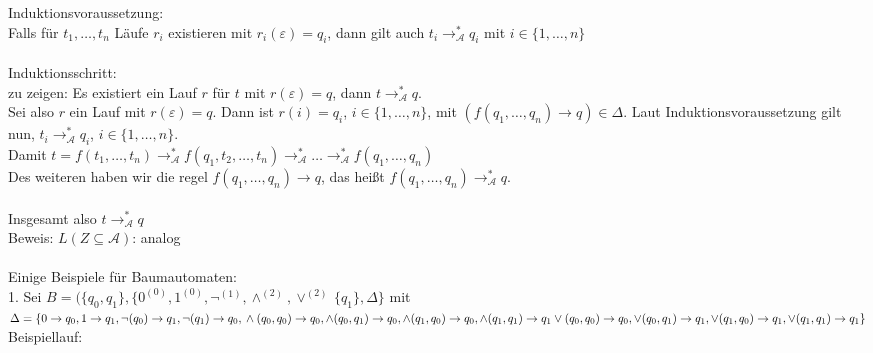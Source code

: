 \documentclass[titlepage]{article}
\begin{document}
Induktionsvoraussetzung:\\
Falls f\"ur $t_1, \dots , t_n$ L\"aufe $r_i$ existieren mit $r_i(\varepsilon) = q_i$, 
dann gilt auch $t_i \rightarrow ^\ast_{\mathcal{A}} q_i$ mit $i\in \{1, \dots , n\}$\\ \\

Induktionsschritt:\\
zu zeigen: Es existiert ein Lauf $r$ f\"ur $t$ mit $r(\varepsilon) = q$, dann 
$t \rightarrow ^\ast_\mathcal{A} q$.\\
Sei also $r$ ein Lauf mit $r(\varepsilon) = q$. Dann ist $r(i) = q_i$, 
$i \in \{1, \dots, n\}$, mit
$(f(q_1, \dots, q_n) \rightarrow q) \in \Delta$. Laut Induktionsvoraussetzung gilt nun,
$t_i \rightarrow ^\ast_\mathcal{A} q_i$, $i \in \{1, \dots, n\}$.\\
Damit $t = f(t_1, \dots, t_n) 
\rightarrow ^\ast_\mathcal{A} f(q_1, t_2, \dots, t_n)
\rightarrow ^\ast_\mathcal{A} \dots
\rightarrow ^\ast_\mathcal{A} f(q_1, \dots, q_n)$\\
Des weiteren haben wir die regel $f(q_1, \dots, q_n) \rightarrow q$, das hei\ss t 
$f(q_1, \dots, q_n) \rightarrow ^\ast_\mathcal{A} q$.\\ \\

Insgesamt also $t \rightarrow ^\ast_\mathcal{A} q$ \\

Beweis: \glqq$L(Z \subseteq \mathcal{A})$\grqq: analog\\ \\

Einige Beispiele f\"ur Baumautomaten:\\

1. Sei $B = (\{q_0, q_1\}, \{0^{(0)},1^{(0)},\lnot^{(1)},\land^{(2)},\lor^{(2)}\,
\{q_1\},\Delta\}$ mit\\
$\Delta = \{ 0 \rightarrow q_0, 1 \rightarrow q_1,\\
\lnot (q_0) \rightarrow q_1, \lnot (q_1) \rightarrow q_0,\\
\land (q_0, q_0) \rightarrow q_0, \land (q_0, q_1) \rightarrow q_0, 
\land (q_1, q_0) \rightarrow q_0, \land (q_1, q_1) \rightarrow q_1\\
\lor (q_0, q_0) \rightarrow q_0, \lor (q_0, q_1) \rightarrow q_1, 
\lor (q_1, q_0) \rightarrow q_1, \lor (q_1, q_1) \rightarrow q_1\}$\\

Beispiellauf:\\
\end{document}
